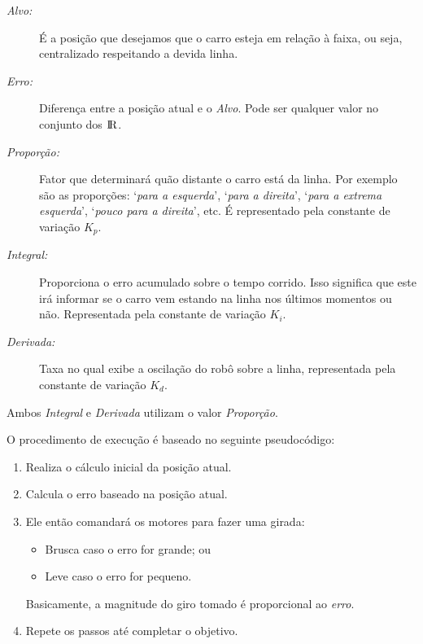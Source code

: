 \documentclass[portugues, brazil, a4paper,12pt]{article}
\begin{document}
			\begin{description}
				\item[\textit{Alvo:}] É a posição que desejamos que o carro esteja em relação à faixa, ou seja, centralizado respeitando a devida linha.
				
				\item[\textit{Erro:}] Diferença entre a posição atual e o \textit{Alvo}. Pode ser qualquer valor no conjunto dos ${\rm I\!R}$.
				
				\item[\textit{Proporção:}] Fator que determinará quão distante o carro está da linha. Por exemplo são as proporções: `\textit{para a esquerda}',  `\textit{para a direita}', `\textit{para a extrema esquerda}', `\textit{pouco para a direita}', etc. É representado pela constante de variação $ K_p $.
				
				\item[\textit{Integral:}] Proporciona o erro acumulado sobre o tempo corrido. Isso significa que este irá informar se o carro vem estando na linha nos últimos momentos ou não. Representada pela constante de variação $ K_i $.
				
				\item[\textit{Derivada:}] Taxa no qual exibe a oscilação do robô sobre a linha, representada pela constante de variação $ K_d $.
			\end{description}
			
			Ambos \textit{Integral} e \textit{Derivada} utilizam o valor \textit{Proporção}.
		
			O procedimento de execução é baseado no seguinte pseudocódigo:
			\begin{enumerate}
				\item Realiza o cálculo inicial da posição atual.
				
				\item Calcula o erro baseado na posição atual.
				
				\item Ele então comandará os motores para fazer uma girada:
				\begin{itemize}
					\item Brusca caso o erro for grande; ou
					\item Leve caso o erro for pequeno.
				\end{itemize}
				Basicamente, a magnitude do giro tomado é proporcional ao \textit{erro}.
				
				\item Repete os passos até completar o objetivo.
			\end{enumerate}
			
\end{document}
